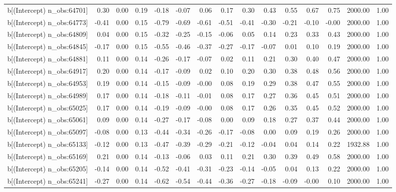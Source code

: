 \begin{table}[ht]
\begin{tabular}{rrrrrrrrrrrrrrr}
  b[(Intercept) n\_obs:64701] & 0.30 & 0.00 & 0.19 & -0.18 & -0.07 & 0.06 & 0.17 & 0.30 & 0.43 & 0.55 & 0.67 & 0.75 & 2000.00 & 1.00 \\ 
  b[(Intercept) n\_obs:64773] & -0.41 & 0.00 & 0.15 & -0.79 & -0.69 & -0.61 & -0.51 & -0.41 & -0.30 & -0.21 & -0.10 & -0.00 & 2000.00 & 1.00 \\ 
  b[(Intercept) n\_obs:64809] & 0.04 & 0.00 & 0.15 & -0.32 & -0.25 & -0.15 & -0.06 & 0.05 & 0.14 & 0.23 & 0.33 & 0.43 & 2000.00 & 1.00 \\ 
  b[(Intercept) n\_obs:64845] & -0.17 & 0.00 & 0.15 & -0.55 & -0.46 & -0.37 & -0.27 & -0.17 & -0.07 & 0.01 & 0.10 & 0.19 & 2000.00 & 1.00 \\ 
  b[(Intercept) n\_obs:64881] & 0.11 & 0.00 & 0.14 & -0.26 & -0.17 & -0.07 & 0.02 & 0.11 & 0.21 & 0.30 & 0.40 & 0.47 & 2000.00 & 1.00 \\ 
  b[(Intercept) n\_obs:64917] & 0.20 & 0.00 & 0.14 & -0.17 & -0.09 & 0.02 & 0.10 & 0.20 & 0.30 & 0.38 & 0.48 & 0.56 & 2000.00 & 1.00 \\ 
  b[(Intercept) n\_obs:64953] & 0.19 & 0.00 & 0.14 & -0.15 & -0.09 & -0.00 & 0.08 & 0.19 & 0.29 & 0.38 & 0.47 & 0.55 & 2000.00 & 1.00 \\ 
  b[(Intercept) n\_obs:64989] & 0.17 & 0.00 & 0.14 & -0.18 & -0.11 & -0.01 & 0.08 & 0.17 & 0.27 & 0.36 & 0.45 & 0.51 & 2000.00 & 1.00 \\ 
  b[(Intercept) n\_obs:65025] & 0.17 & 0.00 & 0.14 & -0.19 & -0.09 & -0.00 & 0.08 & 0.17 & 0.26 & 0.35 & 0.45 & 0.52 & 2000.00 & 1.00 \\ 
  b[(Intercept) n\_obs:65061] & 0.09 & 0.00 & 0.14 & -0.27 & -0.17 & -0.08 & 0.00 & 0.09 & 0.18 & 0.27 & 0.37 & 0.44 & 2000.00 & 1.00 \\ 
  b[(Intercept) n\_obs:65097] & -0.08 & 0.00 & 0.13 & -0.44 & -0.34 & -0.26 & -0.17 & -0.08 & 0.00 & 0.09 & 0.19 & 0.26 & 2000.00 & 1.00 \\ 
  b[(Intercept) n\_obs:65133] & -0.12 & 0.00 & 0.13 & -0.47 & -0.39 & -0.29 & -0.21 & -0.12 & -0.04 & 0.04 & 0.14 & 0.22 & 1932.88 & 1.00 \\ 
  b[(Intercept) n\_obs:65169] & 0.21 & 0.00 & 0.14 & -0.13 & -0.06 & 0.03 & 0.11 & 0.21 & 0.30 & 0.39 & 0.49 & 0.58 & 2000.00 & 1.00 \\ 
  b[(Intercept) n\_obs:65205] & -0.14 & 0.00 & 0.14 & -0.52 & -0.41 & -0.31 & -0.23 & -0.14 & -0.05 & 0.04 & 0.13 & 0.22 & 2000.00 & 1.00 \\ 
  b[(Intercept) n\_obs:65241] & -0.27 & 0.00 & 0.14 & -0.62 & -0.54 & -0.44 & -0.36 & -0.27 & -0.18 & -0.09 & -0.00 & 0.10 & 2000.00 & 1.00 \\ 

\end{tabular}
\end{table}
